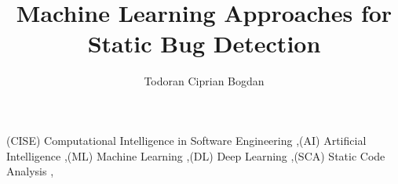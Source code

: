 \documentclass[3p,times,procedia]{elsarticle}
\begin{document}
\begin{frontmatter}

%

\title{\textbf{Machine Learning Approaches for Static Bug Detection}}

\author{Todoran Ciprian Bogdan} 

\address{Department of Computer Science, Babe\c s-Bolyai University\\1, M. Kog\u alniceanu Street, 400084, Cluj-Napoca, Romania\\E-mail: ciprian.todoran@stud.ubbcluj.ro}



\begin{keyword}
(CISE) Computational Intelligence in Software Engineering \sep (AI) Artificial Intelligence \sep (ML) Machine Learning \sep (DL) Deep Learning \sep (SCA) Static Code Analysis \sep 
\end{keyword}
\end{frontmatter}











\footnotesize{

\newpage



\newpage
\printglossaries

} 
\end{document}
